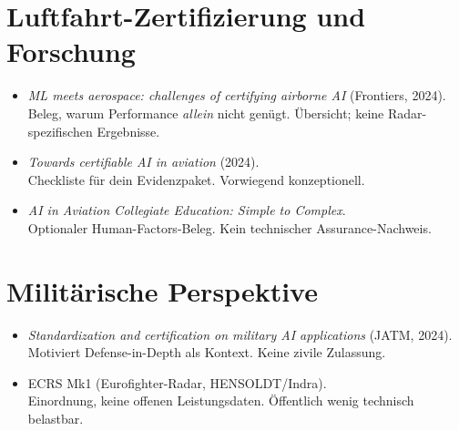 \section{Luftfahrt-Zertifizierung und Forschung}
\begin{itemize}
  \item \textit{ML meets aerospace: challenges of certifying airborne AI} (Frontiers, 2024).\\
      {Beleg, warum Performance \emph{allein} nicht genügt.}
      {Übersicht; keine Radar-spezifischen Ergebnisse.}

  \item \textit{Towards certifiable AI in aviation} (2024).\\
      {Checkliste für dein Evidenzpaket.}
      {Vorwiegend konzeptionell.}

  \item \textit{AI in Aviation Collegiate Education: Simple to Complex}.\\
      {Optionaler Human-Factors-Beleg.}
      {Kein technischer Assurance-Nachweis.}
\end{itemize}

\section{Militärische Perspektive}
\begin{itemize}
  \item \textit{Standardization and certification on military AI applications} (JATM, 2024).\\
      {Motiviert Defense-in-Depth als Kontext.}
      {Keine zivile Zulassung.}

  \item ECRS Mk1 (Eurofighter-Radar, HENSOLDT/Indra).\\
      {Einordnung, keine offenen Leistungsdaten.}
      {Öffentlich wenig technisch belastbar.}
\end{itemize}

